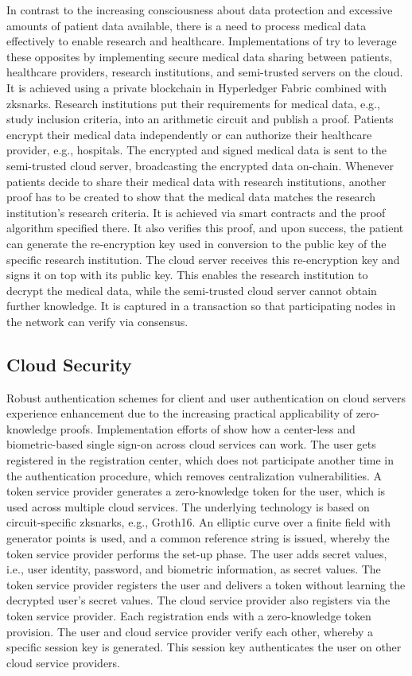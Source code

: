 In contrast to the increasing consciousness about data protection and excessive amounts of patient data available, there is a need to process medical data effectively to enable research and healthcare. Implementations of \citet{Huangetal} try to leverage these opposites by implementing secure medical data sharing between patients, healthcare providers, research institutions, and semi-trusted servers on the cloud. It is achieved using a private blockchain in Hyperledger Fabric combined with \acrshort{zksnark}s. Research institutions put their requirements for medical data, e.g., study inclusion criteria, into an arithmetic circuit and publish a proof. Patients encrypt their medical data independently or can authorize their healthcare provider, e.g., hospitals. The encrypted and signed medical data is sent to the semi-trusted cloud server, broadcasting the encrypted data on-chain. Whenever patients decide to share their medical data with research institutions, another proof has to be created to show that the medical data matches the research institution's research criteria. It is achieved via smart contracts and the proof algorithm specified there. It also verifies this proof, and upon success, the patient can generate the re-encryption key used in conversion to the public key of the specific research institution. The cloud server receives this re-encryption key and signs it on top with its public key. This enables the research institution to decrypt the medical data, while the semi-trusted cloud server cannot obtain further knowledge. It is captured in a transaction so that participating nodes in the network can verify via consensus.

\subsection{Cloud Security}
Robust authentication schemes for client and user authentication on cloud servers experience enhancement due to the increasing practical applicability of zero-knowledge proofs. Implementation efforts of \citet{LiuWangPengXing} show how a center-less and biometric-based single sign-on across cloud services can work. The user gets registered in the registration center, which does not participate another time in the authentication procedure, which removes centralization vulnerabilities. A token service provider generates a zero-knowledge token for the user, which is used across multiple cloud services. The underlying technology is based on circuit-specific \acrshort{zksnark}s, e.g., Groth16. An elliptic curve over a finite field with generator points is used, and a common reference string is issued, whereby the token service provider performs the set-up phase. The user adds secret values, i.e., user identity, password, and biometric information, as secret values. The token service provider registers the user and delivers a token without learning the decrypted user's secret values. The cloud service provider also registers via the token service provider. Each registration ends with a zero-knowledge token provision. The user and cloud service provider verify each other, whereby a specific session key is generated. This session key authenticates the user on other cloud service providers. 

